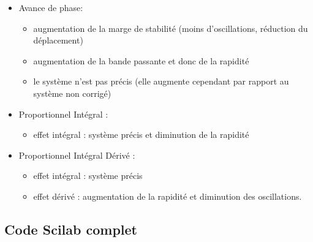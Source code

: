 \begin{itemize}
    \item Avance de phase: 
        \begin{itemize}
            \item augmentation de la marge de stabilité 
                  (moins d'oscillations, réduction du déplacement)
            \item augmentation de la bande passante et donc de la rapidité
            \item le système n'est pas précis (elle augmente cependant par 
                  rapport au système non corrigé)
        \end{itemize}
    \item Proportionnel Intégral : 
        \begin{itemize}
            \item effet intégral : système précis et diminution de la rapidité 
        \end{itemize} 
    \item Proportionnel Intégral Dérivé :
        \begin{itemize}
            \item effet intégral : système précis
            \item effet dérivé : augmentation de la rapidité et 
                  diminution des oscillations.
        \end{itemize} 
\end{itemize}
\clearpage
\subsection*{Code Scilab complet}
\inputminted{scilab}{codes/scilab/code_exercice_chap_correction.sce}
